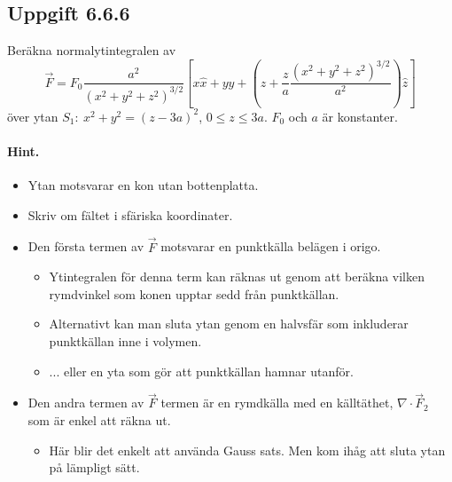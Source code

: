 \documentclass[%
oneside,                 %
final,                   %
10pt]{article}
\newenvironment{doconceexercise}{}{}
\newcounter{doconceexercisecounter}
\begin{document}
\begin{doconceexercise}

\subsection{Uppgift 6.6.6}

Beräkna normalytintegralen av
\begin{equation}
\vec{F}= F_0 \frac{a^2}{(x^2+y^2+z^2)^{3/2}} \left[ x \hat{x}  + y \hat{y} 
+ \left( z + \frac{z}{a} \frac{(x^2+y^2+z^2)^{3/2}}{a^2} \right) \hat{z} \right ]
\end{equation}
över ytan $S_1:\ x^2+y^2=(z-3a)^2$, $0\leq z\leq 3a$. $F_0$ och $a$ är konstanter.


\paragraph{Hint.}
\begin{itemize}
\item Ytan motsvarar en kon utan bottenplatta.

\item Skriv om fältet i sfäriska koordinater. 

\item Den första termen av $\vec{F}$ motsvarar en punktkälla belägen i origo.
\begin{itemize}

  \item Ytintegralen för denna term kan räknas ut genom att beräkna vilken rymdvinkel som konen upptar sedd från punktkällan.

  \item Alternativt kan man sluta ytan genom en halvsfär som inkluderar punktkällan inne i volymen.

  \item ... eller en yta som gör att punktkällan hamnar utanför.

\end{itemize}

\noindent
\item Den andra termen av $\vec{F}$ termen är en rymdkälla med en källtäthet, $\nabla \cdot \vec{F}_2$ som är enkel att räkna ut.
\begin{itemize}

  \item Här blir det enkelt att använda Gauss sats. Men kom ihåg att sluta ytan på lämpligt sätt.
\end{itemize}


\end{itemize}
\end{doconceexercise}
\end{document}
